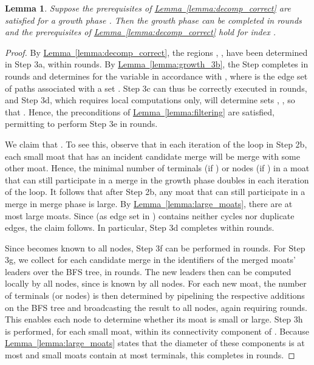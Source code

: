 \documentclass[letterpaper,11pt]{article}
\newtheorem{lemma}[theorem]{Lemma}
\newcommand{\namedref}[2]{\hyperref[#2]{#1~\ref*{#2}}}
\newcommand{\lemmaref}[1]{\namedref{Lemma}{#1}}
\begin{document}
\begin{lemma}\label{lemma:growth_phase}
Suppose the prerequisites of \lemmaref{lemma:decomp_correct} are satisfied for a
growth phase . Then the growth phase can be
completed in  rounds and the prerequisites of
\lemmaref{lemma:decomp_correct} hold for index .
\end{lemma}
\begin{proof}By \lemmaref{lemma:decomp_correct}, the regions , ,
have been determined in Step 3a, within  rounds. By
\lemmaref{lemma:growth_3b}, the Step completes in  rounds and
determines for  the variable  in accordance with , where 
is the edge set of paths associated with a set . Step 3c can
thus be correctly executed in  rounds, and Step 3d, which requires local
computations only, will determine sets , , so that
. Hence, the
preconditions of \lemmaref{lemma:filtering} are satisfied, permitting to perform
Step 3e in  rounds.

We claim that . To
see this, observe that in each iteration of the loop in Step 2b, each small moat
that has an incident candidate merge will be merge with some other moat. Hence,
the minimal number of terminals (if ) or nodes (if ) in a moat
that can still participate in a merge in the growth phase doubles in each
iteration of the loop. It follows that after Step 2b, any moat that can still
participate in a merge in merge phase  is large. By
\lemmaref{lemma:large_moats}, there are at most  large moats. Since
 (as edge set in ) contains neither cycles nor duplicate edges, the
claim follows. In particular, Step 3d completes within  rounds.

Since  becomes known to all nodes, Step 3f can be performed in 
rounds. For Step 3g, we collect for each candidate merge in  the
identifiers of the merged moats' leaders over the BFS tree, in
 rounds. The new leaders then can be
computed locally by all nodes, since  is known by all nodes. For each new
moat, the number of terminals (or nodes) is then determined by pipelining the
respective additions on the BFS tree and broadcasting the result to all nodes,
again requiring  rounds. This enables each node to determine
whether its moat is small or large. Step 3h is performed, for each small moat,
within its connectivity component of . Because
\lemmaref{lemma:large_moats} states that the diameter of these components is at
most  and small moats contain at most  terminals, this
completes in  rounds.


\end{proof}
\end{document}
